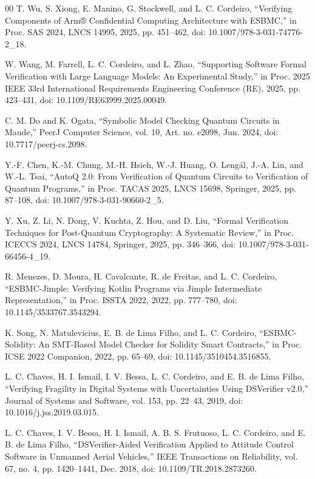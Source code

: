 \documentclass[journal]{IEEEtran} %
\begin{document}
\begin{thebibliography}{00}
 T. Wu, S. Xiong, E. Manino, G. Stockwell, and L. C. Cordeiro, “Verifying Components of Arm® Confidential Computing Architecture with ESBMC,” in Proc. SAS 2024, LNCS 14995, 2025, pp. 451–462, doi: 10.1007/978-3-031-74776-2\_18.

 W. Wang, M. Farrell, L. C. Cordeiro, and L. Zhao, “Supporting Software Formal Verification with Large Language Models: An Experimental Study,” in Proc. 2025 IEEE 33rd International Requirements Engineering Conference (RE), 2025, pp. 423–431, doi: 10.1109/RE63999.2025.00049.

 C. M. Do and K. Ogata, “Symbolic Model Checking Quantum Circuits in Maude,” PeerJ Computer Science, vol. 10, Art. no. e2098, Jun. 2024, doi: 10.7717/peerj-cs.2098.

 Y.-F. Chen, K.-M. Chung, M.-H. Hsieh, W.-J. Huang, O. Lengál, J.-A. Lin, and W.-L. Tsai, “AutoQ 2.0: From Verification of Quantum Circuits to Verification of Quantum Programs,” in Proc. TACAS 2025, LNCS 15698, Springer, 2025, pp. 87–108, doi: 10.1007/978-3-031-90660-2\_5.

 Y. Xu, Z. Li, N. Dong, V. Kuchta, Z. Hou, and D. Liu, “Formal Verification Techniques for Post-Quantum Cryptography: A Systematic Review,” in Proc. ICECCS 2024, LNCS 14784, Springer, 2025, pp. 346–366, doi: 10.1007/978-3-031-66456-4\_19.

 R. Menezes, D. Moura, H. Cavalcante, R. de Freitas, and L. C. Cordeiro, “ESBMC-Jimple: Verifying Kotlin Programs via Jimple Intermediate Representation,” in Proc. ISSTA 2022, 2022, pp. 777–780, doi: 10.1145/3533767.3543294.

 K. Song, N. Matulevicius, E. B. de Lima Filho, and L. C. Cordeiro, “ESBMC-Solidity: An SMT-Based Model Checker for Solidity Smart Contracts,” in Proc. ICSE 2022 Companion, 2022, pp. 65–69, doi: 10.1145/3510454.3516855.

 L. C. Chaves, H. I. Ismail, I. V. Bessa, L. C. Cordeiro, and E. B. de Lima Filho, “Verifying Fragility in Digital Systems with Uncertainties Using DSVerifier v2.0,” Journal of Systems and Software, vol. 153, pp. 22–43, 2019, doi: 10.1016/j.jss.2019.03.015.

 L. C. Chaves, I. V. Bessa, H. I. Ismail, A. B. S. Frutuoso, L. C. Cordeiro, and E. B. de Lima Filho, “DSVerifier-Aided Verification Applied to Attitude Control Software in Unmanned Aerial Vehicles,” IEEE Transactions on Reliability, vol. 67, no. 4, pp. 1420–1441, Dec. 2018, doi: 10.1109/TR.2018.2873260.


\end{thebibliography}
\end{document}

